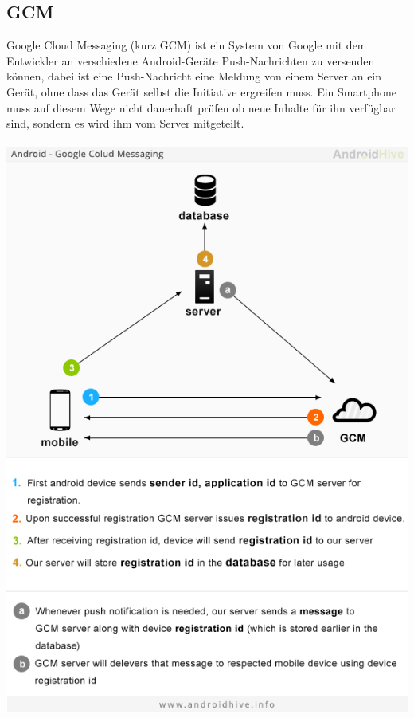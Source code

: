 \documentclass[10pt, a4paper,headsepline]{scrreprt}
\begin{document}
\subsection{GCM}
Google Cloud Messaging (kurz GCM) ist ein System von Google mit dem Entwickler an verschiedene Android-Geräte Push-Nachrichten zu versenden können, dabei ist eine Push-Nachricht eine Meldung von einem Server an ein Gerät, ohne dass das Gerät selbst die Initiative ergreifen muss. Ein Smartphone muss auf diesem Wege nicht dauerhaft prüfen ob neue Inhalte für ihn verfügbar sind, sondern es wird ihm vom Server mitgeteilt. \\ \\
\includegraphics[scale=0.6]{gcm-a-modr.png} \\ \\ %
\end{document}
